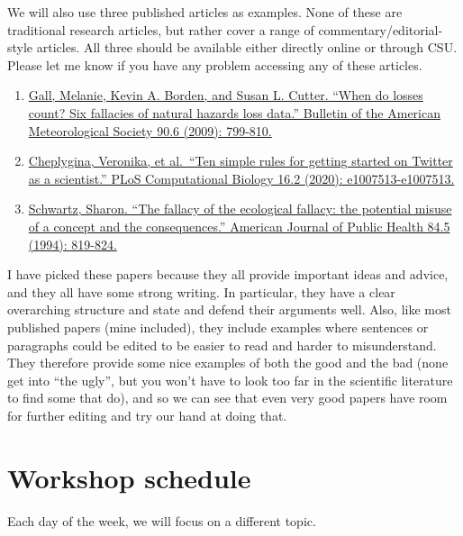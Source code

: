 \documentclass[]{tufte-book}
\providecommand{\tightlist}{%
  \setlength{\itemsep}{0pt}\setlength{\parskip}{0pt}}
\begin{document}
We will also use three published articles as examples. None of these are traditional research
articles, but rather cover a range of commentary/editorial-style articles. All three should be
available either directly online or through CSU. Please let me know if you have any problem
accessing any of these articles.

\begin{enumerate}
\def\labelenumi{\arabic{enumi}.}
\tightlist
\item
  \href{https://journals.ametsoc.org/bams/article/90/6/799/59608/When-Do-Losses-Count-Six-Fallacies-of-Natural}{Gall, Melanie, Kevin A. Borden, and Susan L. Cutter. ``When do losses count?
  Six fallacies of natural hazards loss data.'' Bulletin of the American
  Meteorological Society 90.6 (2009):
  799-810.}
\item
  \href{https://journals.plos.org/ploscompbiol/article?id=10.1371/journal.pcbi.1007513}{Cheplygina, Veronika, et al.~``Ten simple rules for getting started on
  Twitter as a scientist.'' PLoS Computational Biology 16.2 (2020):
  e1007513-e1007513.}
\item
  \href{https://ajph.aphapublications.org/doi/abs/10.2105/AJPH.84.5.819}{Schwartz, Sharon. ``The fallacy of the ecological fallacy: the potential
  misuse of a concept and the consequences.'' American Journal of Public Health
  84.5 (1994):
  819-824.}
\end{enumerate}

I have picked these papers because they all provide important ideas and advice, and
they all have some strong writing. In particular, they have a clear overarching structure
and state and defend their arguments well. Also, like most published papers (mine included),
they include examples where sentences or paragraphs could be edited to be easier to read
and harder to misunderstand. They therefore provide some nice examples of both the good and
the bad (none get into ``the ugly'', but you won't have to look too far in the scientific
literature to find some that do), and so we can see that even very good papers have room
for further editing and try our hand at doing that.

\hypertarget{workshop-schedule}{%
\section{Workshop schedule}\label{workshop-schedule}}

Each day of the week, we will focus on a different topic.
\end{document}
